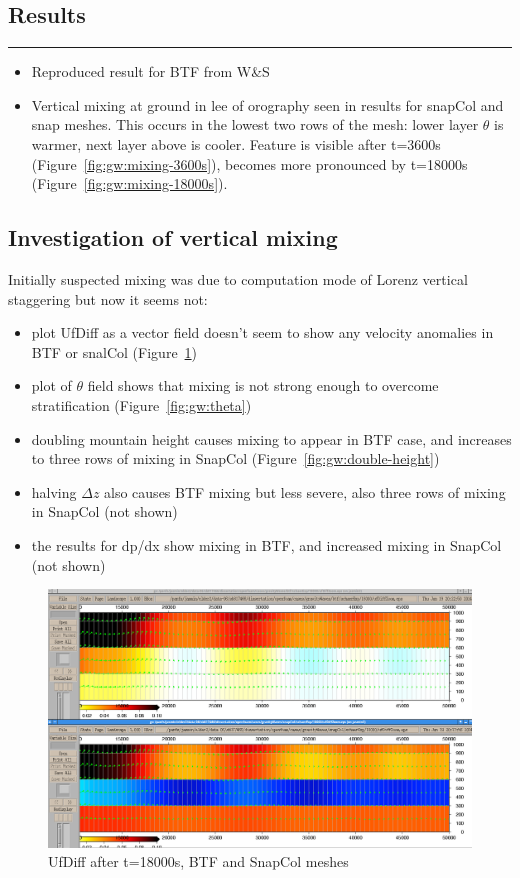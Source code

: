 \subsection{Results}


\hrule

\begin{itemize}
\item Reproduced result for BTF from W\&S
\item Vertical mixing at ground in lee of orography seen in results for snapCol and snap meshes.  This occurs in the lowest two rows of the mesh: lower layer $\theta$ is warmer, next layer above is cooler.  Feature is visible after t=3600s (Figure~\ref{fig:gw:mixing-3600s}), becomes more pronounced by t=18000s (Figure~\ref{fig:gw:mixing-18000s}).
\end{itemize}

\subsection{Investigation of vertical mixing}
Initially suspected mixing was due to computation mode of Lorenz vertical staggering but now it seems not:
\begin{itemize}
	\item plot UfDiff as a vector field doesn't seem to show any velocity anomalies in BTF or snalCol (Figure~\ref{fig:gw:ufdiff})
	\item plot of $\theta$ field shows that mixing is not strong enough to overcome stratification (Figure~\ref{fig:gw:theta})
	\item doubling mountain height causes mixing to appear in BTF case, and increases to three rows of mixing in SnapCol (Figure~\ref{fig:gw:double-height})
	\item halving $\Delta z$ also causes BTF mixing but less severe, also three rows of mixing in SnapCol (not shown)
	\item the results for dp/dx show mixing in BTF, and increased mixing in SnapCol (not shown)
\end{itemize}

\begin{figure}
	\includegraphics[width=\textwidth]{interim-results/gravityWavesBTFSnapColVelocityVectors.png}
	\caption{UfDiff after t=18000s, BTF and SnapCol meshes}
	\label{fig:gw:ufdiff}
\end{figure}


